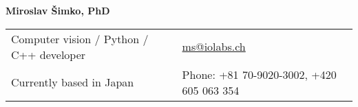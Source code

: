 \documentclass[a4paper,11pt,oneside]{article}
\begin{document}

\noindent  \LARGE{\textbf{Miroslav Šimko, PhD}}  \\
\vspace{-2ex}
\normalsize


\begin{center}
\begin{tabular}{l l}
 Computer vision / Python / C++ developer & \hspace{1in} \href{mailto:ms@iolabs.ch}{ms@iolabs.ch} \\
 Currently based in Japan & \hspace{1in} Phone: +81 70-9020-3002,  +420 605 063 354\\
\end{tabular}
\end{center}

\vspace{1em}

\end{document}
